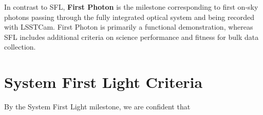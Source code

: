 \documentclass[SE,authoryear,toc,lsstdraft]{lsstdoc}
\begin{document}
In contrast to SFL, \textbf{First Photon} is the milestone corresponding to first on-sky photons passing through the fully integrated optical system and being recorded with LSSTCam.
First Photon is primarily a functional demonstration, whereas SFL includes additional criteria on science performance and fitness for bulk data collection.

\section{System First Light Criteria}
\label{criteria}

By the System First Light milestone, we are confident that
\end{document}
